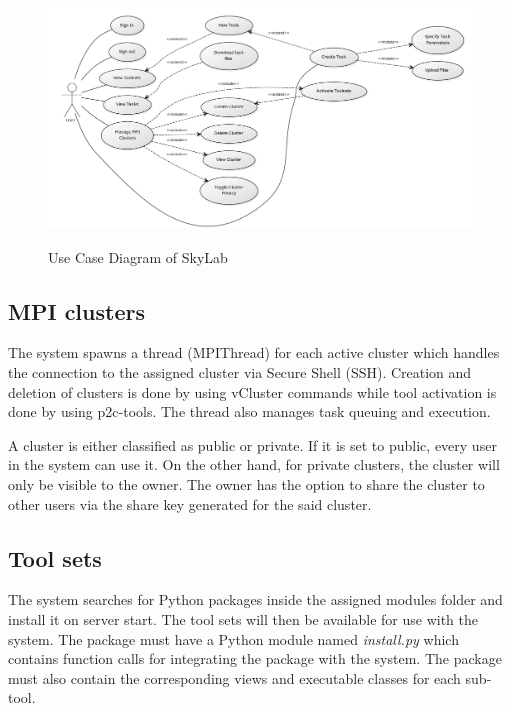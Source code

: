 	
    \begin{figure}[ht]
      \centering
      \includegraphics[width=500px,height=250px]{./images/use_case_large.png}
      \caption{Use Case Diagram of SkyLab}\label{System Architecture}
    \end{figure}

\subsection{MPI clusters} 

The system spawns a thread (MPIThread) for each active cluster which handles the connection to the assigned cluster via Secure Shell (SSH). Creation and deletion of clusters is done by using vCluster commands while tool activation is done by using p2c-tools. The thread also manages task queuing and execution.
		
A cluster is either classified as public or private. If it is set to public, every user in the system can use it. On the other hand, for private clusters, the cluster will only be visible to the owner. The owner has the option to share the cluster to other users via the share key generated for the said cluster. 		

\subsection{Tool sets} 
The system searches for Python packages inside the assigned modules folder and install it on server start. The tool sets will then be available for use with the system. The package must have a Python module named \emph{install.py} which contains function calls for integrating the package with the system. The package must also contain the corresponding views and executable classes for each sub-tool.  

